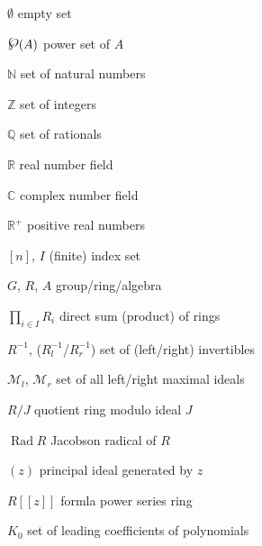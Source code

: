 \documentclass[12pt, oneside]{book}
\newcommand{\powerset}{\raisebox{.15\baselineskip}{\Large\ensuremath{\wp}}}
\def\Rad{\operatorname{Rad}}
\begin{document}
\begin{changemargin}{-2cm}{-2cm} 

\begin{minipage}[t]{0.6\textwidth}

$\emptyset$ \hfill empty set\

\medskip

$\powerset(A)$ \hfill power set of $A$\

\medskip

$\mathbb{N}$ \hfill set of natural numbers\

\medskip

$\mathbb{Z}$ \hfill set of integers\

\medskip

$\mathbb{Q}$ \hfill set of rationals\

\medskip

$\mathbb{R}$ \hfill real number field\

\medskip

$\mathbb{C}$ \hfill complex number field\

\medskip

$\mathbb{R^+}$ \hfill positive real numbers\

\medskip

$[n]$, $I$ \hfill (finite) index set

\medskip

$G$, $R$, $A$ \hfill group/ring/algebra\

\medskip

$\prod_{i \in I} R_i$ \hfill direct sum (product) of rings\

\medskip

$R^{-1}$, ($R_l^{-1}$/$R_r^{-1}$) \hfill set of (left/right) invertibles\

\medskip

$\mathcal{M}_l$, $\mathcal{M}_r$ \hfill set of all left/right maximal ideals\

\medskip

$R/J$ \hfill quotient ring modulo ideal $J$\

\medskip

$\Rad R$ \hfill Jacobson radical of $R$\

\medskip

$(z)$ \hfill principal ideal generated by $z$\

\medskip

$R[[z]]$ \hfill formla power series ring\

\medskip

$K_0$ \hfill set of leading coefficients of polynomials\


\end{minipage}
\end{changemargin}
\end{document}
